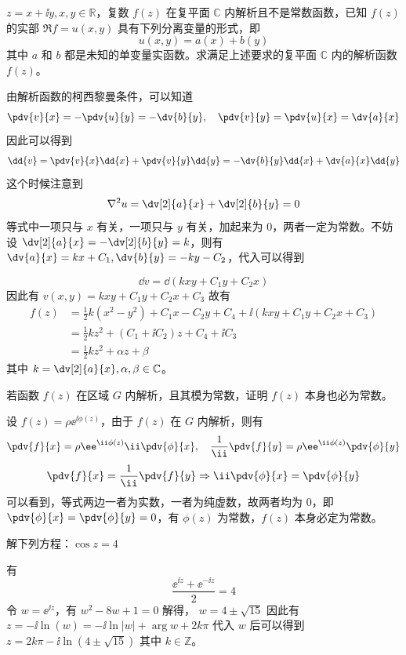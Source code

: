 \begin{question}
\(z=x+\ii y, x,y \in \mathbb{R}\)，复数 \(f(z)\) 在复平面 \(\mathbb{C}\) 内解析且不是常数函数，已知 \(f(z)\) 的实部 \(\Re f=u(x,y)\) 具有下列分离变量的形式，即 \[
u(x,y) = a(x) + b(y)
\]
其中 \(a\) 和 \(b\) 都是未知的单变量实函数。求满足上述要求的复平面 \(\mathbb{C}\) 内的解析函数 \(f(z)\)。
\begin{solution}
由解析函数的柯西黎曼条件，可以知道 \[
\pdv{v}{x}=-\pdv{u}{y}=-\dv{b}{y}, \quad \pdv{v}{y}=\pdv{u}{x}=\dv{a}{x}
\]
因此可以得到 \[
\dd{v}=\pdv{v}{x} \dd{x}+\pdv{v}{y} \dd{y} = -\dv{b}{y} \dd{x} + \dv{a}{x} \dd{y}
\]
这个时候注意到 \[
\nabla^2 u = \dv[2]{a}{x} + \dv[2]{b}{y}=0
\]
等式中一项只与 \(x\) 有关，一项只与 \(y\) 有关，加起来为 \(0\)，两者一定为常数。不妨设 \(\dv[2]{a}{x}=-\dv[2]{b}{y}=k\)，则有 \(\dv{a}{x}=k x + C_1,\dv{b}{y}=-k y - C_2\)，代入可以得到

\[
\dd{v} =  \dd{(k x y + C_1 y + C_2 x)}
\]
因此有 \(v(x,y) = k x y + C_1 y + C_2 x + C_3\)
故有 \[
\begin{aligned}
f(z)&=\frac12 k (x^2 - y^2) + C_1 x - C_2 y + C_4 + \ii (k x y +C_1 y + C_2 x + C_3) \\
&= \frac12 k z^2 + (C_1 +\ii C_2) z + C_4 + \ii C_3 \\
&= \frac12 k z^2 + \alpha z + \beta
\end{aligned}
\]
其中 \(k= \dv[2]{a}{x}, \alpha,\beta \in \mathbb{C}\)。
\end{solution}
\end{question}

\begin{question}
若函数 \(f(z)\) 在区域 \(G\) 内解析，且其模为常数，证明 \(f(z)\) 本身也必为常数。
\begin{solution}
设 \(f(z) = \rho \ee^{\ii \phi(z)}\)，由于 \(f(z)\) 在 \(G\) 内解析，则有 \[
\pdv{f}{x}= \rho \ee^{\ii \phi(z)} \ii \pdv{\phi}{x}, \quad \frac{1}{\ii} \pdv{f}{y} = \rho \ee^{\ii \phi(z)} \pdv{\phi}{y}
\]
\[
\pdv{f}{x} =\frac{1}{\ii} \pdv{f}{y} \Rightarrow \ii \pdv{\phi}{x} = \pdv{\phi}{y}
\]
可以看到，等式两边一者为实数，一者为纯虚数，故两者均为 \(0\)，即 \(\pdv{\phi}{x}=\pdv{\phi}{y}=0\)，有 \(\phi(z)\) 为常数，\(f(z)\) 本身必定为常数。
\end{solution}
\end{question}

\begin{question}
解下列方程：\( \cos z = 4 \)
\begin{solution}
有
\[
\frac{\ee^{\ii z} + \ee^{-\ii z}}{2} = 4
\]
令 \(w = \ee^{\ii z}\)，有 \( w^2 -8 w + 1=0 \)
解得， \( w=4 \pm \sqrt{15} \)
因此有 \( z= -\ii \ln(w) = -\ii \ln |w| + \arg w + 2k \pi \)
代入 \(w\) 后可以得到 \( z=2k \pi - \ii \ln (4 \pm \sqrt{15}) \)
其中 \(k \in \mathbb{Z}\)。
\end{solution}
\end{question}

